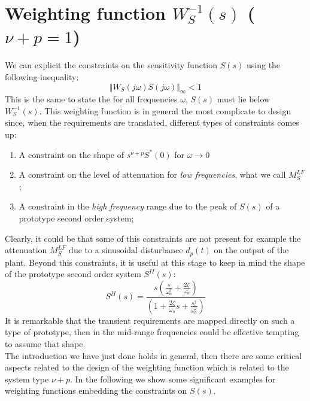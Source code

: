 \documentclass[a4paper, 12pt]{article}
\begin{document}
    \section{Weighting function $W_S^{-1}(s)$ ($\nu+p=1$)}
    We can explicit the constraints on the sensitivity function $S(s)$ using the following inequality: 
    \begin{equation}
        \Vert W_S(j\omega)S(j\omega) \Vert_\infty < 1
    \end{equation}
    This is the same to state the for all frequencies $\omega$, $S(s)$ must lie below $W_S^{-1}(s)$. This weighting function is in general the most complicate to design since, when the requirements are translated, different types of constraints comes up:
    \vspace{-0.2cm}
    \begin{enumerate}
        \itemsep-0.3em
        \item A constraint on the shape of $s^{\nu+p}S^*{(0)}$ for $\omega\to0$
        \item A constraint on the level of attenuation for \textit{low frequencies}, what we call $M_S^{LF}$; 
        \item A constraint in the \textit{high frequency} range due to the peak of $S(s)$ of a prototype second order system; 
    \end{enumerate}
    Clearly, it could be that some of this constraints are not present for example the attenuation $M_S^{LF}$ due to a sinusoidal disturbance $d_p(t)$ on the output of the plant.
    Beyond this constraints, it is useful at this stage to keep in mind the shape of the prototype second order system $S^{II}(s)$:
    \begin{equation}
        S^{II}(s)=\frac{s(\frac{s}{\omega_n^2}+\frac{2\zeta}{\omega_n})}{(1+\frac{2\zeta}{\omega_n}s+\frac{s^2}{\omega_n^2})}
    \end{equation}
    It is remarkable that the transient requirements are mapped directly on such a type of prototype, then in the mid-range frequencies could be effective tempting to assume that shape. \\
    The introduction we have just done holds in general, then there are some critical aspects related to the design of the weighting function which is related to the system type $\nu+p$. 
    In the following we show some significant examples for weighting functions embedding the constraints on $S(s)$.
\end{document}
